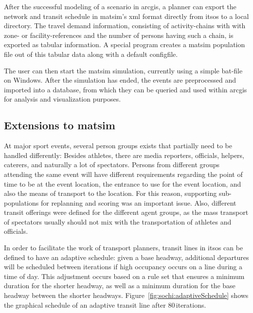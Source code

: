 After the successful modeling of a scenario in \gls{arcgis}, a planner can export
the network and transit schedule in \gls{matsim}'s \gls{xml} format directly from \gls{itsos} to a
local directory. The travel demand information, consisting of activity-chains
with with zone- or facility-references and the number of persons having such a
chain, is exported as tabular information. A special program creates a \gls{matsim}
population file out of this tabular data along with a default \gls{configfile}.

The user can then start the \gls{matsim} simulation, currently using a simple bat-file
on Windows. After the simulation has ended, the events are preprocessed and
imported into a database, from which they can be queried and used within \gls{arcgis}
for analysis and visualization purposes.

\subsection{Extensions to \protect\gls{matsim}}
At major sport events, several person groups exists that partially need to be
handled differently: Besides athletes, there are media reporters, officials,
helpers, caterers, and naturally a lot of spectators. Persons from different
groups attending the same event will have different requirements regarding the
point of time to be at the event location, the entrance to use for the event
location, and also the means of transport to the location. For this reason,
supporting sub-populations for \gls{replanning} and scoring was an important issue.
Also, different transit offerings were defined for the different agent groups,
as the mass transport of spectators usually should not mix with the
transportation of athletes and officials.

In order to facilitate the work of transport planners, transit lines in
\gls{itsos} can be defined to have an adaptive schedule: given a base headway,
additional departures will be scheduled between iterations if high
occupancy occurs on a line during a time of day. This adjustment occurs based
on a rule set that ensures a minimum duration for the shorter headway, as well
as a minimum duration for the base headway between the shorter headways.
Figure~\ref{fig:sochi:adaptiveSchedule} shows the graphical schedule of an
adaptive transit line after 80\,iterations.

